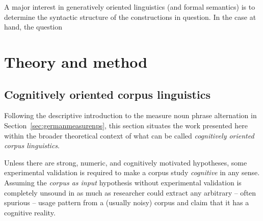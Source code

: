 \documentclass[USenglish]{article}
\begin{document}
A major interest in generatively oriented linguistics (and formal semantics) is to determine the syntactic structure of the constructions in question.
In the case at hand, the question


\section{Theory and method}

\subsection{Cognitively oriented corpus linguistics}
\label{ssec:cocl}

Following the descriptive introduction to the measure noun phrase alternation in Section~\ref{sec:germanmeasurenps}, this section situates the work presented here within the broader theoretical context of what can be called \textit{cognitively oriented corpus linguistics}.

Unless there are strong, numeric, and cognitively motivated hypotheses, some experimental validation is required to make a corpus study \textit{cognitive} in any sense.
Assuming the \textit{corpus as input} hypothesis without experimental validation is completely unsound in as much as researcher could extract any arbitrary -- often spurious -- usage pattern from a (usually noisy) corpus and claim that it has a cognitive reality.


\end{document}
